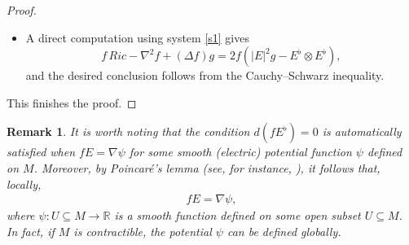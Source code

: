 \documentclass{amsart}
\newtheorem{remark}{Remark}
\numberwithin{equation}{section}
\begin{document}
\begin{proof}
\begin{itemize}
		\item[(vi)] A direct computation using system \eqref{s1} gives
\[
f \, Ric - \nabla^2 f + (\Delta f) g = 2f \left( |E|^{2}g - E^{\flat} \otimes E^{\flat} \right),
\]
and the desired conclusion follows from the Cauchy–Schwarz inequality.
\end{itemize} This finishes the proof.
	\end{proof}
	

	
	
	\begin{remark}	
It is worth noting that the condition \( d(fE^{\flat}) = 0 \) is automatically satisfied when \( fE = \nabla \psi \) for some smooth (electric) potential function \( \psi \) defined on \( M \). Moreover, by Poincar\'e's lemma (see, for instance, \cite[Corollary 11.50]{lee}), it follows that, locally,
\begin{eqnarray*}
fE = \nabla \psi,
\end{eqnarray*}
where \( \psi: U \subseteq M \to \mathbb{R} \) is a smooth function defined on some open subset \( U \subseteq M \). In fact, if \( M \) is contractible, the potential \( \psi \) can be defined globally.
\end{remark}

	
	
\end{document}

